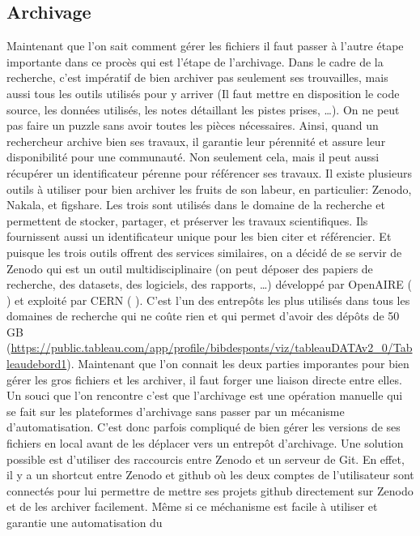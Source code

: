 \documentclass[11pt]{article}
\begin{document}
\subsection{Archivage}
\label{sec:org629ba4a}
Maintenant que l'on sait comment gérer les fichiers il faut passer à
l'autre étape importante dans ce procès qui est l'étape de
l'archivage. Dans le cadre de la recherche, c’est impératif de bien
archiver pas seulement ses trouvailles, mais aussi tous les outils
utilisés pour y arriver (Il faut mettre en disposition le code source,
les données utilisés, les notes détaillant les pistes prises, …). On
ne peut pas faire un puzzle sans avoir toutes les pièces
nécessaires. Ainsi, quand un rechercheur archive bien ses travaux, il
garantie leur pérennité et assure leur disponibilité pour une
communauté. Non seulement cela, mais il peut aussi récupérer un
identificateur pérenne pour référencer ses travaux. Il existe
plusieurs outils à utiliser pour bien archiver les fruits de son
labeur, en particulier: Zenodo, Nakala, et figshare. Les trois sont
utilisés dans le domaine de la recherche et permettent de stocker,
partager, et préserver les travaux scientifiques. Ils fournissent
aussi un identificateur unique pour les bien citer et référencier.  Et
puisque les trois outils offrent des services similaires, on a décidé
de se servir de Zenodo qui est un outil multidisciplinaire (on peut
déposer des papiers de recherche, des datasets, des logiciels, des
rapports, \ldots{}) développé par OpenAIRE ( ) et exploité par CERN ( ).
C’est l’un des entrepôts les plus utilisés dans tous les domaines de
recherche qui ne coûte rien et qui permet d’avoir des dépôts de 50 GB
(\url{https://public.tableau.com/app/profile/bibdesponts/viz/tableauDATAv2\_0/Tableaudebord1}).
Maintenant que l’on connait les deux parties imporantes pour bien
gérer les gros fichiers et les archiver, il faut forger une liaison
directe entre elles. Un souci que l’on rencontre c’est que l’archivage
est une opération manuelle qui se fait sur les plateformes d’archivage
sans passer par un mécanisme d’automatisation. C’est donc parfois
compliqué de bien gérer les versions de ses fichiers en local avant de
les déplacer vers un entrepôt d’archivage. Une solution possible est
d’utiliser des raccourcis entre Zenodo et un serveur de Git. En effet,
il y a un shortcut entre Zenodo et github où les deux comptes de
l'utilisateur sont connectés pour lui permettre de mettre ses projets
github directement sur Zenodo et de les archiver facilement. Même si
ce méchanisme est facile à utiliser et garantie une automatisation du
\end{document}
